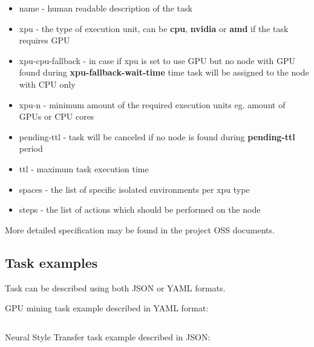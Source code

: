 \begin{itemize}
    \item name - human readable description of the task
    \item xpu - the type of execution unit, can be \textbf{cpu}, \textbf{nvidia} or \textbf{amd} if the task requires GPU
    \item xpu-cpu-fallback - in case if xpu is set to use GPU but no node with GPU found during \textbf{xpu-fallback-wait-time} time task will be assigned to the node with CPU only
    \item xpu-n - minimum amount of the required execution units eg. amount of GPUs or CPU cores
    \item pending-ttl - task will be canceled if no node is found during \textbf{pending-ttl} period
    \item ttl - maximum task execution time
    \item spaces - the list of specific isolated environments per xpu type
    \item steps - the list of actions which should be performed on the node
\end{itemize}

More detailed specification may be found in the project OSS\cite{oss} documents.

\subsection{Task examples}

Task can be described using both JSON or YAML formats.

GPU mining task example described in YAML format:

\inputminted{yaml}{claymore-cuda-mining-task.yaml}

\newpage
Neural Style Transfer task example described in JSON:

\inputminted{json}{neural-style-task.json}
